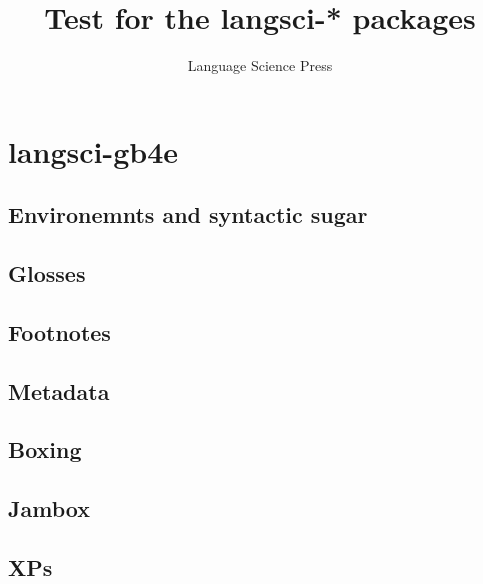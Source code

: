 \documentclass[biblatex
	      ,output=short
	      ,nonflat
	      ,modfonts
	      ]{langsci/langscibook}
\title{Test for the langsci-* packages}
\author{Language Science Press}
\begin{document}
\maketitle
 
\section{langsci-gb4e}
\subsection{Environemnts and syntactic sugar}

% 







\subsection{Glosses}







\subsection{Footnotes}




\subsection{Metadata}

\subsection{Boxing}

% 
\subsection{Jambox}



\subsection{XPs}


  
\end{document}

